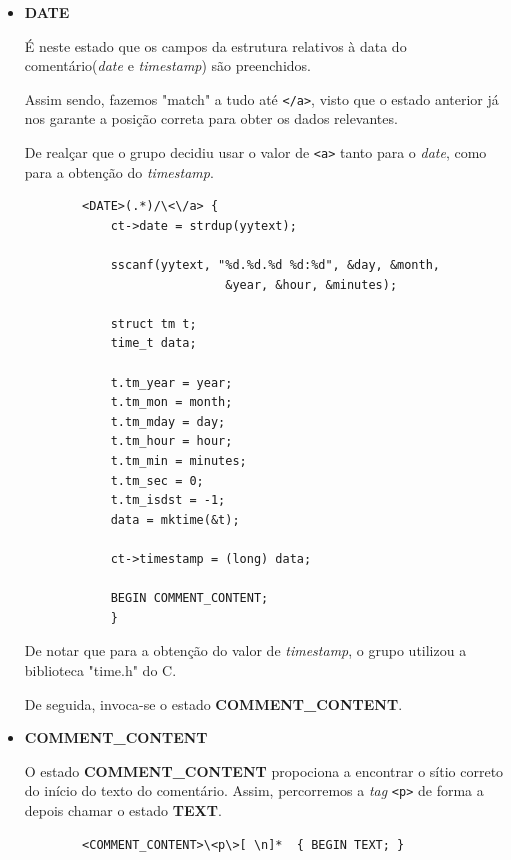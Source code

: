 \documentclass[a4paper,12pt]{report}
\newcommand*{\xml}[1]{\texttt{<#1>}}
\begin{document}
\vspace{1cm}

\begin{itemize}
    \item 
    \textbf{DATE}
    \par É neste estado que os campos da estrutura relativos à data do comentário(\textit{date} e \textit{timestamp}) são preenchidos.
    \par Assim sendo, fazemos "match" a tudo até \xml{/a}, visto que o estado anterior já nos garante a posição correta para obter os dados relevantes.
    
    \par De realçar que o grupo decidiu usar o valor de \xml{a} tanto para o \textit{date}, como para a obtenção do \textit{timestamp}.
    
    \begin{verbatim}
        <DATE>(.*)/\<\/a> {
            ct->date = strdup(yytext);

            sscanf(yytext, "%d.%d.%d %d:%d", &day, &month,
                            &year, &hour, &minutes);

            struct tm t;
            time_t data;

            t.tm_year = year;
            t.tm_mon = month;
            t.tm_mday = day;
            t.tm_hour = hour;
            t.tm_min = minutes;
            t.tm_sec = 0;
            t.tm_isdst = -1;
            data = mktime(&t);

            ct->timestamp = (long) data;

            BEGIN COMMENT_CONTENT;
            }
    \end{verbatim}
    
    De notar que para a obtenção do valor de \textit{timestamp}, o grupo utilizou a biblioteca "time.h" do C. 
    \par De seguida, invoca-se o estado \textbf{COMMENT\_CONTENT}.
\end{itemize}

\vspace{1cm}

\begin{itemize}
    \item 
    \textbf{COMMENT\_CONTENT}
    \par O estado \textbf{COMMENT\_CONTENT} propociona a encontrar o sítio correto do início do texto do comentário. Assim, percorremos a \textit{tag} \xml{p} de forma a depois chamar o estado \textbf{TEXT}.
    
    \begin{verbatim}
        <COMMENT_CONTENT>\<p\>[ \n]*  { BEGIN TEXT; }
    \end{verbatim}
\end{itemize}
\end{document}
